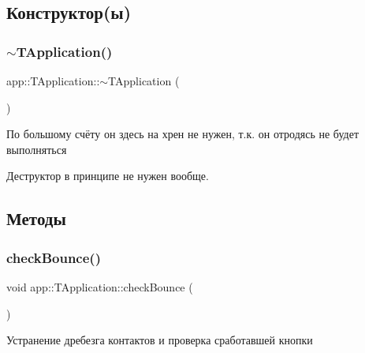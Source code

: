 \subsection{Конструктор(ы)}
\mbox{\label{classapp_1_1_t_application_a5b7af31c95dab9a3f14ee792429a0737}} 
\subsubsection{\texorpdfstring{$\sim$\+T\+Application()}{~TApplication()}}
{\footnotesize\ttfamily app\+::\+T\+Application\+::$\sim$\+T\+Application (\begin{DoxyParamCaption}{ }\end{DoxyParamCaption})\hspace{0.3cm}{\ttfamily [virtual]}}



По большому счёту он здесь на хрен не нужен, т.\+к. он отродясь не будет выполняться 



 Деструктор в принципе не нужен вообще. 

\subsection{Методы}
\mbox{\label{classapp_1_1_t_application_a4c4d1d33ea8ab73ba49a59528d200501}} 
\subsubsection{\texorpdfstring{check\+Bounce()}{checkBounce()}}
{\footnotesize\ttfamily void app\+::\+T\+Application\+::check\+Bounce (\begin{DoxyParamCaption}{ }\end{DoxyParamCaption})}



Устранение дребезга контактов и проверка сработавшей кнопки 

